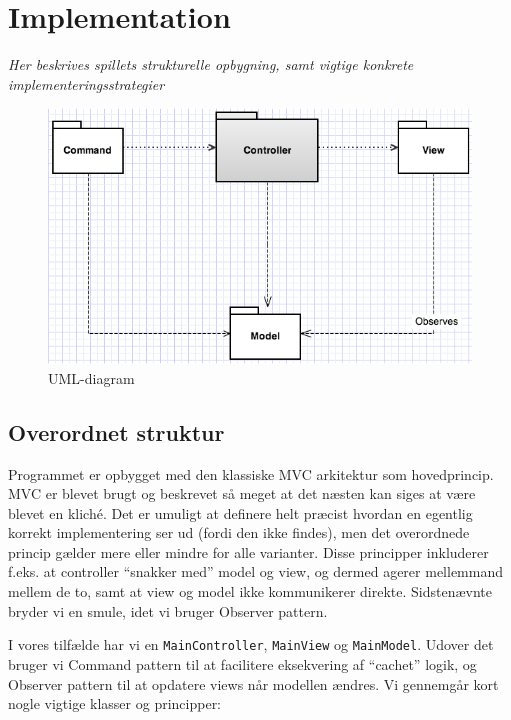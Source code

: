 \documentclass[titlepage,danish]{article}
\newcommand{\code}[1]{\texttt{#1}}
\begin{document}
\section{Implementation}
\emph{Her beskrives spillets strukturelle opbygning, samt vigtige konkrete implementeringsstrategier}
\begin{figure}[h!]
  \centering
  \includegraphics[scale=0.60]{MVC.png}
  \caption{UML-diagram}
  \label{fig:MVC_diagram}
  \end{figure}
\subsection{Overordnet struktur}
Programmet er opbygget med den klassiske MVC arkitektur som hovedprincip. MVC er blevet brugt og
beskrevet så meget at det næsten kan siges at være blevet en kliché. Det er umuligt at definere helt
præcist hvordan en egentlig korrekt implementering ser ud (fordi den ikke findes), men det
overordnede princip gælder mere eller mindre for alle varianter. Disse principper inkluderer
f.eks. at controller ``snakker med'' model og view, og dermed agerer mellemmand mellem de to, samt at
view og model ikke kommunikerer direkte. Sidstenævnte bryder vi en smule, idet vi bruger Observer
pattern.

I vores tilfælde har vi en \code{MainController}, \code{MainView} og \code{MainModel}. Udover det
bruger vi Command pattern til at facilitere eksekvering af ``cachet'' logik, og Observer pattern til
at opdatere views når modellen ændres. Vi gennemgår kort nogle vigtige klasser og principper:
\end{document}
